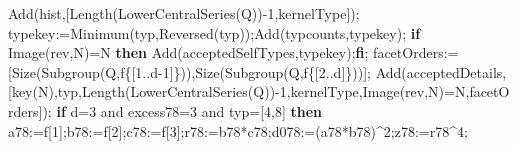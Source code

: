 \documentclass[
  10pt,
  letterpaper,
]{article}
\newenvironment{Shaded}{}{}
\newcommand{\BuiltInTok}[1]{\textcolor[rgb]{0.00,0.50,0.00}{#1}}
\newcommand{\ConstantTok}[1]{\textcolor[rgb]{0.53,0.00,0.00}{#1}}
\newcommand{\ControlFlowTok}[1]{\textcolor[rgb]{0.00,0.44,0.13}{\textbf{#1}}}
\newcommand{\FloatTok}[1]{\textcolor[rgb]{0.25,0.63,0.44}{#1}}
\newcommand{\NormalTok}[1]{#1}
\newcommand{\OperatorTok}[1]{\textcolor[rgb]{0.40,0.40,0.40}{#1}}
\newcommand{\VariableTok}[1]{\textcolor[rgb]{0.10,0.09,0.49}{#1}}
\begin{document}
\begin{Shaded}
\begin{Highlighting}[]
   \BuiltInTok{Add}\NormalTok{(}\VariableTok{hist}\OperatorTok{,}\NormalTok{[}\BuiltInTok{Length}\NormalTok{(}\BuiltInTok{LowerCentralSeries}\NormalTok{(}\VariableTok{Q}\NormalTok{))}\OperatorTok{{-}}\FloatTok{1}\OperatorTok{,}\VariableTok{kernelType}\NormalTok{])}\OperatorTok{;}
   \VariableTok{typekey}\OperatorTok{:=}\BuiltInTok{Minimum}\NormalTok{(}\VariableTok{typ}\OperatorTok{,}\BuiltInTok{Reversed}\NormalTok{(}\VariableTok{typ}\NormalTok{))}\OperatorTok{;}\BuiltInTok{Add}\NormalTok{(}\VariableTok{typcounts}\OperatorTok{,}\VariableTok{typekey}\NormalTok{)}\OperatorTok{;}
   \ControlFlowTok{if} \BuiltInTok{Image}\NormalTok{(}\VariableTok{rev}\OperatorTok{,}\VariableTok{N}\NormalTok{)}\OperatorTok{=}\VariableTok{N} \ControlFlowTok{then} \BuiltInTok{Add}\NormalTok{(}\VariableTok{acceptedSelfTypes}\OperatorTok{,}\VariableTok{typekey}\NormalTok{)}\OperatorTok{;}\ControlFlowTok{fi}\OperatorTok{;}
   \VariableTok{facetOrders}\OperatorTok{:=}\NormalTok{[}\BuiltInTok{Size}\NormalTok{(}\BuiltInTok{Subgroup}\NormalTok{(}\VariableTok{Q}\OperatorTok{,}\VariableTok{f}\NormalTok{\{[}\FloatTok{1}\OperatorTok{..}\VariableTok{d}\OperatorTok{{-}}\FloatTok{1}\NormalTok{]\}))}\OperatorTok{,}\BuiltInTok{Size}\NormalTok{(}\BuiltInTok{Subgroup}\NormalTok{(}\VariableTok{Q}\OperatorTok{,}\VariableTok{f}\NormalTok{\{[}\FloatTok{2}\OperatorTok{..}\VariableTok{d}\NormalTok{]\}))]}\OperatorTok{;}
   \BuiltInTok{Add}\NormalTok{(}\VariableTok{acceptedDetails}\OperatorTok{,}\NormalTok{[}\VariableTok{key}\NormalTok{(}\VariableTok{N}\NormalTok{)}\OperatorTok{,}\VariableTok{typ}\OperatorTok{,}\BuiltInTok{Length}\NormalTok{(}\BuiltInTok{LowerCentralSeries}\NormalTok{(}\VariableTok{Q}\NormalTok{))}\OperatorTok{{-}}\FloatTok{1}\OperatorTok{,}\VariableTok{kernelType}\OperatorTok{,}\BuiltInTok{Image}\NormalTok{(}\VariableTok{rev}\OperatorTok{,}\VariableTok{N}\NormalTok{)}\OperatorTok{=}\VariableTok{N}\OperatorTok{,}\VariableTok{facetOrders}\NormalTok{])}\OperatorTok{;}
   \ControlFlowTok{if} \VariableTok{d}\OperatorTok{=}\FloatTok{3} \ConstantTok{and} \VariableTok{excess78}\OperatorTok{=}\FloatTok{3} \ConstantTok{and} \VariableTok{typ}\OperatorTok{=}\NormalTok{[}\FloatTok{4}\OperatorTok{,}\FloatTok{8}\NormalTok{] }\ControlFlowTok{then}
    \VariableTok{a78}\OperatorTok{:=}\VariableTok{f}\NormalTok{[}\FloatTok{1}\NormalTok{]}\OperatorTok{;}\VariableTok{b78}\OperatorTok{:=}\VariableTok{f}\NormalTok{[}\FloatTok{2}\NormalTok{]}\OperatorTok{;}\VariableTok{c78}\OperatorTok{:=}\VariableTok{f}\NormalTok{[}\FloatTok{3}\NormalTok{]}\OperatorTok{;}\VariableTok{r78}\OperatorTok{:=}\VariableTok{b78}\OperatorTok{*}\VariableTok{c78}\OperatorTok{;}\VariableTok{d078}\OperatorTok{:=}\NormalTok{(}\VariableTok{a78}\OperatorTok{*}\VariableTok{b78}\NormalTok{)}\OperatorTok{\^{}}\FloatTok{2}\OperatorTok{;}\VariableTok{z78}\OperatorTok{:=}\VariableTok{r78}\OperatorTok{\^{}}\FloatTok{4}\OperatorTok{;}

\end{Highlighting}
\end{Shaded}
\end{document}
